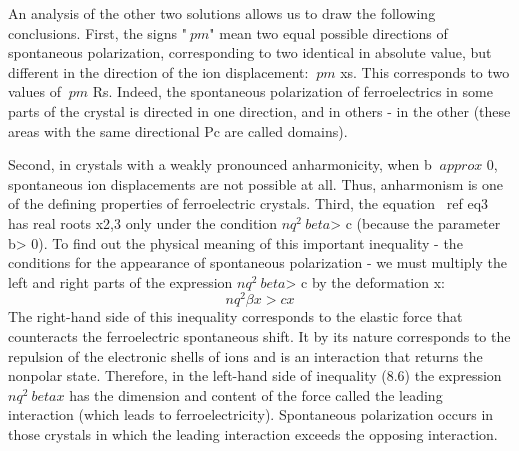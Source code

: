 \documentclass[a4paper,14pt]{extreport}
\begin{document}
An analysis of the other two solutions allows us to draw the following conclusions. First, the signs "$ \ pm $" mean two equal possible directions of spontaneous polarization, corresponding to two identical in absolute value, but different in the direction of the ion displacement: $ \ pm $ xs. This corresponds to two values ​​of $ \ pm $ Rs. Indeed, the spontaneous polarization of ferroelectrics in some parts of the crystal is directed in one direction, and in others - in the other (these areas with the same directional Pc are called domains).

Second, in crystals with a weakly pronounced anharmonicity, when b $ \ approx $ 0, spontaneous ion displacements are not possible at all. Thus, anharmonism is one of the defining properties of ferroelectric crystals.
Third, the equation \ ref {eq3} has real roots x2,3 only under the condition $ n q ^ 2 \ beta $> c (because the parameter b> 0). To find out the physical meaning of this important inequality - the conditions for the appearance of spontaneous polarization - we must multiply the left and right parts of the expression $ n q ^ 2 \ beta $> c by the deformation x:
\begin{equation}
n q^2 \beta x > c x
\end{equation}
The right-hand side of this inequality corresponds to the elastic force that counteracts the ferroelectric spontaneous shift. It by its nature corresponds to the repulsion of the electronic shells of ions and is an interaction that returns the nonpolar state. Therefore, in the left-hand side of inequality (8.6) the expression $ n q ^ 2 \ beta x $ has the dimension and content of the force called the leading interaction (which leads to ferroelectricity). Spontaneous polarization occurs in those crystals in which the leading interaction exceeds the opposing interaction.
\end{document}
